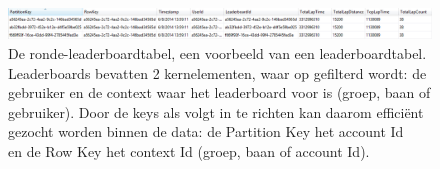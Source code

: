 \begin{figure}[h!]
  \begin{center}
  \includegraphics[width=\textwidth]{style/images/lapLeaderboardStructure}    
  \end{center}
  \caption{De ronde-leaderboardtabel, een voorbeeld van een leaderboardtabel. Leaderboards bevatten 2 kernelementen, waar op gefilterd wordt: de gebruiker en de context waar het leaderboard voor is (groep, baan of gebruiker). Door de keys als volgt in te richten kan daarom efficiënt gezocht worden binnen de data: de Partition Key het account Id\\ en de Row Key het context Id (groep, baan of account Id).}
  \label{fig:lapLeaderboardTableStructure}
\end{figure}

\clearpage

